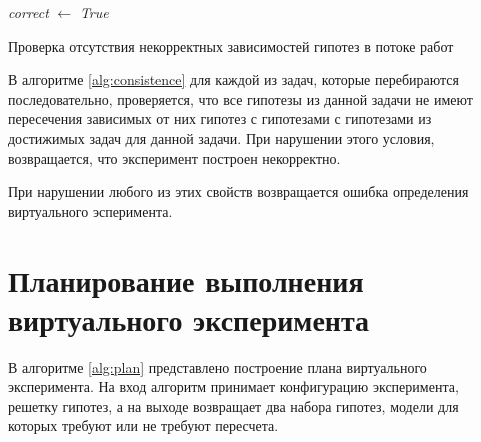 \begin{algorithm}


    \textit{correct} $\gets$ \textit{True}

    \caption{Проверка отсутствия некорректных зависимостей гипотез в потоке работ}\label{alg:consistence}
\end{algorithm}


В алгоритме \ref{alg:consistence} для каждой из задач, которые перебираются последовательно, проверяется, что все гипотезы из 
данной задачи не имеют пересечения зависимых от них гипотез с гипотезами с гипотезами из достижимых задач для данной 
задачи. При нарушении этого условия, возвращается, что эксперимент построен некорректно.

При нарушении любого из этих свойств возвращается ошибка определения виртуального эсперимента.

\section{Планирование выполнения виртуального эксперимента}\label{sect2_}
В алгоритме \ref{alg:plan} представлено построение плана виртуального эксперимента. На вход алгоритм принимает 
конфигурацию эксперимента, решетку гипотез, а на выходе возвращает два набора гипотез, модели для которых требуют или 
не требуют пересчета.



